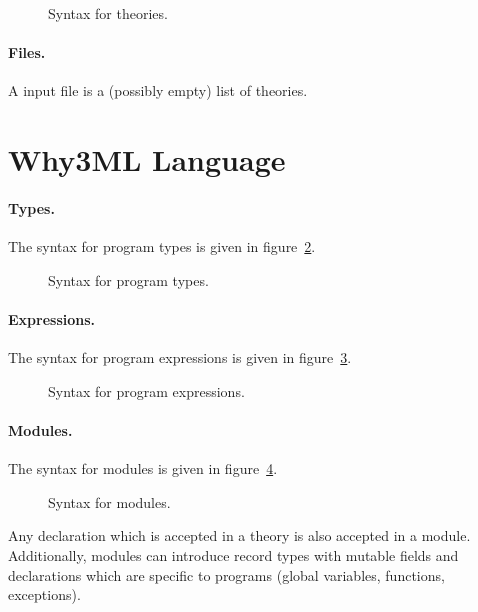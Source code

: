 \begin{figure}
  \begin{center}\framebox{}\end{center}
  \caption{Syntax for theories.}
\label{fig:bnf:theory}
\end{figure}

\paragraph{Files.}
A \why input file is a (possibly empty) list of theories.
\begin{center}\framebox{}\end{center}


\clearpage
\section{Why3ML Language}\label{sec:syntax:whyml}

\paragraph{Types.}
The syntax for program types is given in figure~\ref{fig:bnf:typev}.
\begin{figure}
  \begin{center}\framebox{}\end{center}
  \caption{Syntax for program types.}
\label{fig:bnf:typev}
\end{figure}

\paragraph{Expressions.}
The syntax for program expressions is given in figure~\ref{fig:bnf:expr}.
\begin{figure}
  \begin{center}\framebox{}\end{center}
  \caption{Syntax for program expressions.}
\label{fig:bnf:expr}
\end{figure}

\paragraph{Modules.}
The syntax for modules is given in figure~\ref{fig:bnf:module}.
\begin{figure}
  \begin{center}\framebox{}\end{center}
  \caption{Syntax for modules.}
\label{fig:bnf:module}
\end{figure}
Any declaration which is accepted in a theory is also accepted in a
module. Additionally, modules can introduce record types with mutable
fields and declarations which are specific to programs (global
variables, functions, exceptions).

